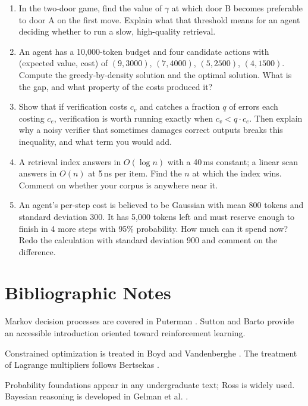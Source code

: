 \begin{enumerate}
\item In the two-door game, find the value of $\gamma$ at which door B becomes
preferable to door A on the first move. Explain what that threshold means for an
agent deciding whether to run a slow, high-quality retrieval.

\item An agent has a 10{,}000-token budget and four candidate actions with
(expected value, cost) of $(9, 3000)$, $(7, 4000)$, $(5, 2500)$, $(4, 1500)$.
Compute the greedy-by-density solution and the optimal solution. What is the gap,
and what property of the costs produced it?

\item Show that if verification costs $c_v$ and catches a fraction $q$ of errors
each costing $c_e$, verification is worth running exactly when $c_v < q \cdot c_e$.
Then explain why a noisy verifier that sometimes damages correct outputs breaks
this inequality, and what term you would add.

\item A retrieval index answers in $O(\log n)$ with a 40\,ms constant; a linear scan
answers in $O(n)$ at 5\,ns per item. Find the $n$ at which the index wins. Comment
on whether your corpus is anywhere near it.

\item An agent's per-step cost is believed to be Gaussian with mean 800 tokens and
standard deviation 300. It has 5{,}000 tokens left and must reserve enough to
finish in 4 more steps with 95\% probability. How much can it spend now? Redo the
calculation with standard deviation 900 and comment on the difference.
\end{enumerate}

\section*{Bibliographic Notes}

Markov decision processes are covered in Puterman \cite{puterman1994markov}. Sutton and Barto \cite{sutton2018reinforcement} provide an accessible introduction oriented toward reinforcement learning.

Constrained optimization is treated in Boyd and Vandenberghe \cite{boyd2004convex}. The treatment of Lagrange multipliers follows Bertsekas \cite{bertsekas1999nonlinear}.

Probability foundations appear in any undergraduate text; Ross \cite{ross2014first} is widely used. Bayesian reasoning is developed in Gelman et al. \cite{gelman2013bayesian}.

